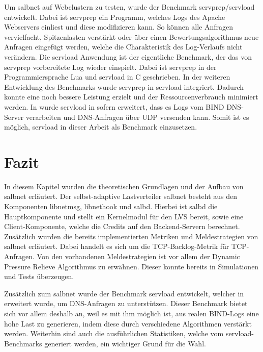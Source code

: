 \documentclass[a4paper, 12pt, BCOR10mm, DIV12, toc=bibliography, toc=listof, german]{scrbook}
\begin{document}
			Um salbnet auf Webclustern zu testen, wurde der Benchmark servprep/servload
			\cite{habenschuss2011} entwickelt. Dabei ist servprep ein Programm, welches Logs des Apache
			Webservers einliest und diese modifizieren kann. So können alle Anfragen vervielfacht,
			Spitzenlasten verstärkt oder über einen Bewertungsalgorithmus neue Anfragen eingefügt werden,
			welche die Charakteristik des Log-Verlaufs nicht verändern. Die servload Anwendung ist der
			eigentliche Benchmark, der das von servprep vorbereitete Log wieder einspielt. Dabei ist
			servprep in der Programmiersprache Lua und servload in C geschrieben. In der weiteren
			Entwicklung des Benchmarks wurde servprep in servload integriert. Dadurch konnte eine noch
			bessere Leistung erzielt und der Ressourcenverbrauch minimiert werden. In \cite{menski2012}
			wurde servload in sofern erweitert, dass es Logs vom BIND DNS-Server verarbeiten und
			DNS-Anfragen über UDP versenden kann. Somit ist es möglich, servload in dieser Arbeit als
			Benchmark einzusetzen.


		\section{Fazit} %
		\label{sec:salbnet-fazit}

			In diesem Kapitel wurden die theoretischen Grundlagen und der Aufbau von salbnet erläutert.
			Der selbst-adaptive Lastverteiler salbnet besteht aus den Komponenten libnetmsg, libnethook
			und salbd. Hierbei ist salbd die Hauptkomponente und stellt ein Kernelmodul für den LVS
			bereit, sowie eine Client-Komponente, welche die Credits auf den Backend-Servern berechnet.
			Zusätzlich wurden die bereits implementierten Metriken und Meldestrategien von salbnet
			erläutert. Dabei handelt es sich um die TCP-Backlog-Metrik für TCP-Anfragen. Von den
			vorhandenen Meldestrategien ist vor allem der Dynamic Pressure Relieve Algorithmus zu
			erwähnen. Dieser konnte bereits in Simulationen und Tests überzeugen.

			Zusätzlich zum salbnet wurde der Benchmark servload entwickelt, welcher in
			\cite{menski2012} erweitert wurde, um DNS-Anfragen zu unterstützen. Dieser
			Benchmark bietet sich vor allem deshalb an, weil es mit ihm möglich ist, aus realen
			BIND-Logs eine hohe Last zu generieren, indem diese durch verschiedene Algorithmen
			verstärkt werden. Weiterhin sind auch die ausführlichen Statistiken, welche vom
			servload-Benchmarks generiert werden, ein wichtiger Grund für die Wahl.
\end{document}
